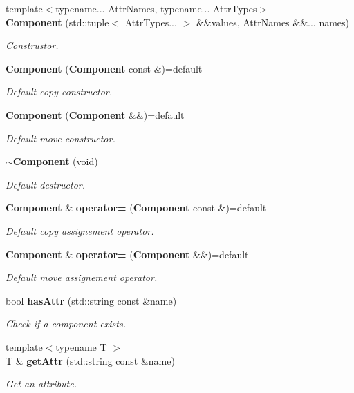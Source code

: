 \begin{DoxyCompactItemize}
\item 
{\footnotesize template$<$typename... Attr\+Names, typename... Attr\+Types$>$ }\\{\bf Component} (std\+::tuple$<$ Attr\+Types... $>$ \&\&values, Attr\+Names \&\&... names)
\begin{DoxyCompactList}\small\item\em Construstor. \end{DoxyCompactList}\item 
{\bf Component} ({\bf Component} const \&)=default
\begin{DoxyCompactList}\small\item\em Default copy constructor. \end{DoxyCompactList}\item 
{\bf Component} ({\bf Component} \&\&)=default
\begin{DoxyCompactList}\small\item\em Default move constructor. \end{DoxyCompactList}\item 
{\bf $\sim$\+Component} (void)
\begin{DoxyCompactList}\small\item\em Default destructor. \end{DoxyCompactList}\item 
{\bf Component} \& {\bf operator=} ({\bf Component} const \&)=default
\begin{DoxyCompactList}\small\item\em Default copy assignement operator. \end{DoxyCompactList}\item 
{\bf Component} \& {\bf operator=} ({\bf Component} \&\&)=default
\begin{DoxyCompactList}\small\item\em Default move assignement operator. \end{DoxyCompactList}\item 
bool {\bf has\+Attr} (std\+::string const \&name)
\begin{DoxyCompactList}\small\item\em Check if a component exists. \end{DoxyCompactList}\item 
{\footnotesize template$<$typename T $>$ }\\T \& {\bf get\+Attr} (std\+::string const \&name)
\begin{DoxyCompactList}\small\item\em Get an attribute. \end{DoxyCompactList}\item 

\end{DoxyCompactItemize}
